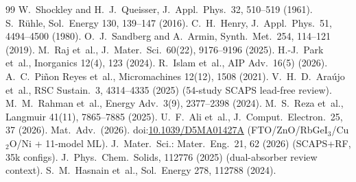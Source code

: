 \documentclass[review]{elsarticle}
\begin{document}
\begin{thebibliography}{99}
 W.~Shockley and H.~J.~Queisser, J.\ Appl.\ Phys.\ 32, 510--519 (1961).
 S.~R\"uhle, Sol.\ Energy 130, 139--147 (2016).
 C.~H.~Henry, J.\ Appl.\ Phys.\ 51, 4494--4500 (1980).
 O.~J.~Sandberg and A.~Armin, Synth.\ Met.\ 254, 114--121 (2019).
 M.~Raj et~al., J.\ Mater.\ Sci.\ 60(22), 9176--9196 (2025).
 H.-J.~Park et~al., Inorganics 12(4), 123 (2024).
 R.~Islam et~al., AIP Adv.\ 16(5) (2026).
 A.~C.~Pi\~non Reyes et~al., Micromachines 12(12), 1508 (2021).
 V.~H.~D.~Ara\'ujo et~al., RSC Sustain.\ 3, 4314--4335 (2025) (54-study SCAPS lead-free review).
 M.~M.~Rahman et~al., Energy Adv.\ 3(9), 2377--2398 (2024).
 M.~S.~Reza et~al., Langmuir 41(11), 7865--7885 (2025).
 U.~F.~Ali et~al., J.\ Comput.\ Electron.\ 25, 37 (2026).
 Mat.\ Adv.\ (2026). doi:\url{10.1039/D5MA01427A} (FTO/ZnO/RbGeI$_{3}$/Cu$_{2}$O/Ni + 11-model ML).
 J.\ Mater.\ Sci.: Mater.\ Eng.\ 21, 62 (2026) (SCAPS+RF, 35k configs).
 J.\ Phys.\ Chem.\ Solids, 112776 (2025) (dual-absorber review context).
 S.~M.~Hasnain et~al., Sol.\ Energy 278, 112788 (2024).
\end{thebibliography}
\end{document}
